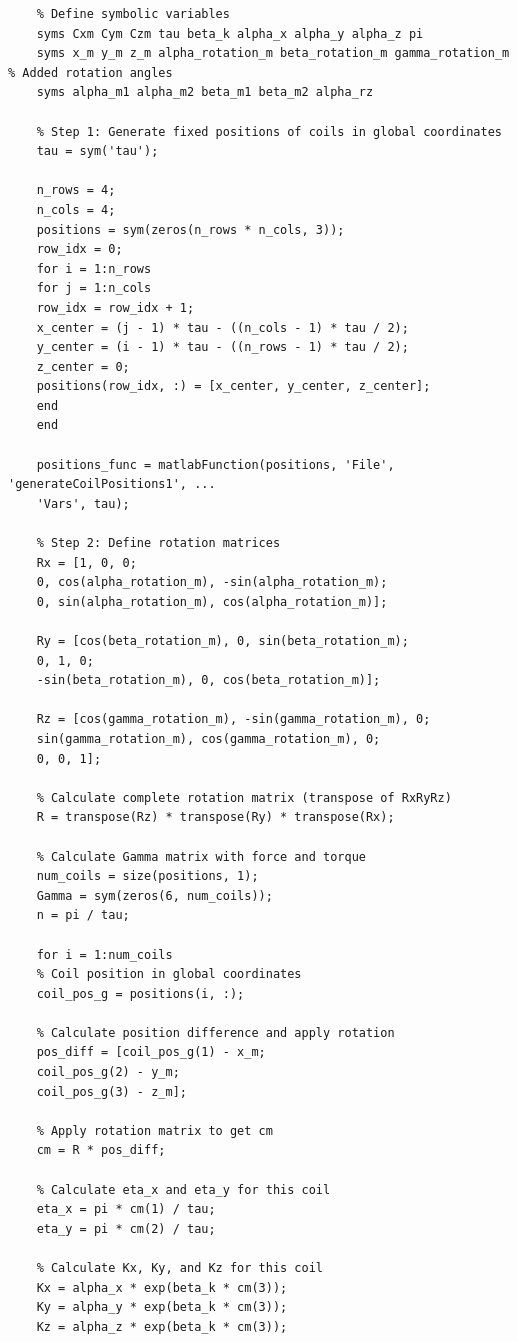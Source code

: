 \begin{latin}
	\begin{verbatim}
	% Define symbolic variables
	syms Cxm Cym Czm tau beta_k alpha_x alpha_y alpha_z pi
	syms x_m y_m z_m alpha_rotation_m beta_rotation_m gamma_rotation_m % Added rotation angles
	syms alpha_m1 alpha_m2 beta_m1 beta_m2 alpha_rz
	
	% Step 1: Generate fixed positions of coils in global coordinates
	tau = sym('tau');
	
	n_rows = 4;
	n_cols = 4;
	positions = sym(zeros(n_rows * n_cols, 3));
	row_idx = 0;
	for i = 1:n_rows
	for j = 1:n_cols
	row_idx = row_idx + 1;
	x_center = (j - 1) * tau - ((n_cols - 1) * tau / 2);
	y_center = (i - 1) * tau - ((n_rows - 1) * tau / 2);
	z_center = 0;
	positions(row_idx, :) = [x_center, y_center, z_center];
	end
	end
	
	positions_func = matlabFunction(positions, 'File', 'generateCoilPositions1', ...
	'Vars', tau);   
	
	% Step 2: Define rotation matrices
	Rx = [1, 0, 0;
	0, cos(alpha_rotation_m), -sin(alpha_rotation_m);
	0, sin(alpha_rotation_m), cos(alpha_rotation_m)];
	
	Ry = [cos(beta_rotation_m), 0, sin(beta_rotation_m);
	0, 1, 0;
	-sin(beta_rotation_m), 0, cos(beta_rotation_m)];
	
	Rz = [cos(gamma_rotation_m), -sin(gamma_rotation_m), 0;
	sin(gamma_rotation_m), cos(gamma_rotation_m), 0;
	0, 0, 1];
	
	% Calculate complete rotation matrix (transpose of RxRyRz)
	R = transpose(Rz) * transpose(Ry) * transpose(Rx);
	
	% Calculate Gamma matrix with force and torque
	num_coils = size(positions, 1);
	Gamma = sym(zeros(6, num_coils));
	n = pi / tau;
	
	for i = 1:num_coils
	% Coil position in global coordinates
	coil_pos_g = positions(i, :);
	
	% Calculate position difference and apply rotation
	pos_diff = [coil_pos_g(1) - x_m;
	coil_pos_g(2) - y_m;
	coil_pos_g(3) - z_m];
	
	% Apply rotation matrix to get cm
	cm = R * pos_diff;
	
	% Calculate eta_x and eta_y for this coil
	eta_x = pi * cm(1) / tau;
	eta_y = pi * cm(2) / tau;
	
	% Calculate Kx, Ky, and Kz for this coil
	Kx = alpha_x * exp(beta_k * cm(3));
	Ky = alpha_y * exp(beta_k * cm(3));
	Kz = alpha_z * exp(beta_k * cm(3));
	

\end{verbatim}
\end{latin}
